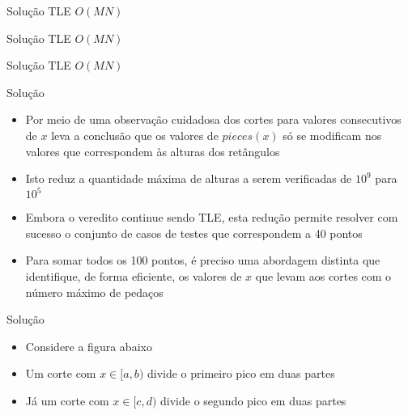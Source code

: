 \begin{frame}[fragile]{Solução TLE $O(MN)$}
\end{frame}

\begin{frame}[fragile]{Solução TLE $O(MN)$}
\end{frame}

\begin{frame}[fragile]{Solução TLE $O(MN)$}
\end{frame}

\begin{frame}[fragile]{Solução}

    \begin{itemize}
        \item Por meio de uma observação cuidadosa dos cortes para valores consecutivos de $x$ 
            leva a conclusão que os valores de $pieces(x)$ só se modificam nos valores que
            correspondem às alturas dos retângulos

        \item Isto reduz a quantidade máxima de alturas a serem verificadas de $10^9$ para $10^5$

        \item Embora o veredito continue sendo TLE, esta redução permite resolver com sucesso o
            conjunto de casos de testes que correspondem a 40 pontos

        \item Para somar todos os 100 pontos, é preciso uma abordagem distinta que identifique,
            de forma eficiente, os valores de $x$ que levam aos cortes com o número máximo de
            pedaços
    \end{itemize}

\end{frame}

\begin{frame}[fragile]{Solução}

    \begin{itemize}
        \item Considere a figura abaixo

        

        \item Um corte com $x\in [a, b)$ divide o primeiro pico em duas partes

        \item Já um corte com $x \in [c, d)$ divide o segundo pico em duas partes

    \end{itemize}

\end{frame}


